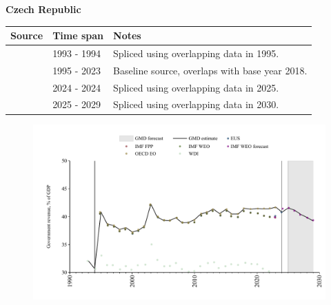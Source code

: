\documentclass[12pt,a4paper,landscape]{article}
\begin{document}
\begin{adjustbox}{max totalsize={\paperwidth}{\paperheight},center}
\begin{minipage}[t][\textheight][t]{\textwidth}
\vspace*{0.5cm}
{}
\begin{center}
{\Large\bfseries Czech Republic}
\end{center}
\vspace{0.5cm}
\begin{table}[H]
\centering
\small
\begin{tabular}{|l|l|l|}
\hline
\textbf{Source} & \textbf{Time span} & \textbf{Notes} \\
\hline
\rowcolor{white}\cite{WDI}& 1993 - 1994 &Spliced using overlapping data in 1995.\\
\rowcolor{lightgray}\cite{OECD_EO}& 1995 - 2023 &Baseline source, overlaps with base year 2018.\\
\rowcolor{white}\cite{EUS}& 2024 - 2024 &Spliced using overlapping data in 2025.\\
\rowcolor{lightgray}\cite{IMF_WEO_forecast}& 2025 - 2029 &Spliced using overlapping data in 2030.\\
\hline
\end{tabular}
\end{table}
\begin{figure}[H]
\centering
\includegraphics[width=\textwidth,height=0.6\textheight,keepaspectratio]{graphs/CZE_govrev_GDP.pdf}
\end{figure}
\end{minipage}
\end{adjustbox}
\end{document}
